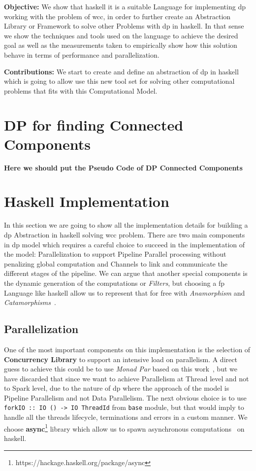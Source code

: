 \documentclass[12pt]{article}
\begin{document}
\textbf{Objective:} We show that \acrshort{haskell} it is a suitable Language for implementing \acrshort{dp} working with the problem of \acrshort{wcc}, in order to further create an Abstraction Library or Framework
to solve other Problems with \acrshort{dp} in \acrshort{haskell}.
In that sense we show the techniques and tools used on the language to achieve the desired goal as well as the measurements taken to empirically show how this solution behave in terms of performance and parallelization.

\textbf{Contributions:} We start to create and define an abstraction of \acrshort{dp} in \acrshort{haskell} which is going to allow use this new tool set for solving other computational problems that fits with this Computational Model.

\section{DP for finding Connected Components}
\textbf{Here we should put the Pseudo Code of DP Connected Components}

\section{Haskell Implementation}
In this section we are going to show all the implementation details for building a \acrshort{dp} Abstraction in \acrshort{haskell} solving \acrshort{wcc} problem.
There are two main components in \acrshort{dp} model which requires a careful choice to succeed in the implementation of the model: Parallelization to support Pipeline Parallel processing without penalizing global computation and Channels to link and communicate 
the different stages of the pipeline. We can argue that another special components is the dynamic generation of the computations or \textit{Filters}, but choosing a \acrfull{fp} Language like \acrshort{haskell} allow us to represent
that for free with \textit{Anamorphism} and \textit{Catamorphisms}~\cite{lenses}.

\subsection{Parallelization}
One of the most important components on this implementation is the selection of \textbf{Concurrency Library} to support an intensive load on parallelism. A direct guess to achieve this
could be to use \textit{Monad Par} based on this work~\cite{monad_par}, but we have discarded that since we want to achieve Parallelism at Thread level and not to Spark level, due to the nature
of \acrshort{dp} where the approach of the model is Pipeline Parallelism and not Data Parallelism. The next obvious choice is to use \texttt{forkIO :: IO () -> IO ThreadId} from \texttt{base}
module, but that would imply to handle all the threads lifecycle, terminations and errors in a custom manner. We choose \textbf{async}\footnote{https://hackage.haskell.org/package/async} 
library which allow us to spawn asynchronous computations~\cite{parallel_book} on \acrshort{haskell}.
\end{document}
